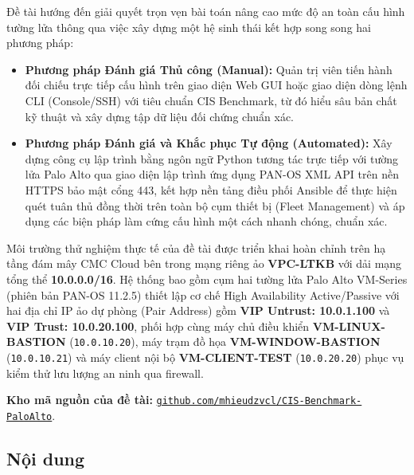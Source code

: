 \documentclass[12pt,a4paper]{article}
\begin{document}
\vspace{0.3cm}

\noindent Đề tài hướng đến giải quyết trọn vẹn bài toán nâng cao mức độ an toàn cấu hình tường lửa thông qua việc xây dựng một hệ sinh thái kết hợp song song hai phương pháp:
\begin{itemize}
    \item \textbf{Phương pháp Đánh giá Thủ công (Manual):} Quản trị viên tiến hành đối chiếu trực tiếp cấu hình trên giao diện Web GUI hoặc giao diện dòng lệnh CLI (Console/SSH) với tiêu chuẩn CIS Benchmark, từ đó hiểu sâu bản chất kỹ thuật và xây dựng tập dữ liệu đối chứng chuẩn xác.
    \item \textbf{Phương pháp Đánh giá và Khắc phục Tự động (Automated):} Xây dựng công cụ lập trình bằng ngôn ngữ Python tương tác trực tiếp với tường lửa Palo Alto qua giao diện lập trình ứng dụng PAN-OS XML API trên nền HTTPS bảo mật cổng 443, kết hợp nền tảng điều phối Ansible để thực hiện quét tuân thủ đồng thời trên toàn bộ cụm thiết bị (Fleet Management) và áp dụng các biện pháp làm cứng cấu hình một cách nhanh chóng, chuẩn xác.
\end{itemize}

\vspace{0.3cm}

\noindent Môi trường thử nghiệm thực tế của đề tài được triển khai hoàn chỉnh trên hạ tầng đám mây CMC Cloud bên trong mạng riêng ảo \textbf{VPC-LTKB} với dải mạng tổng thể \textbf{10.0.0.0/16}. Hệ thống bao gồm cụm hai tường lửa Palo Alto VM-Series (phiên bản PAN-OS 11.2.5) thiết lập cơ chế High Availability Active/Passive với hai địa chỉ IP ảo dự phòng (Pair Address) gồm \textbf{VIP Untrust: 10.0.1.100} và \textbf{VIP Trust: 10.0.20.100}, phối hợp cùng máy chủ điều khiển \textbf{VM-LINUX-BASTION} (\texttt{10.0.10.20}), máy trạm đồ họa \textbf{VM-WINDOW-BASTION} (\texttt{10.0.10.21}) và máy client nội bộ \textbf{VM-CLIENT-TEST} (\texttt{10.0.20.20}) phục vụ kiểm thử lưu lượng an ninh qua firewall.

\vspace{0.3cm}

\noindent\textbf{Kho mã nguồn của đề tài:} \href{https://github.com/mhieudzvcl/CIS-Benchmark-PaloAlto}{\texttt{github.com/mhieudzvcl/CIS-Benchmark-PaloAlto}}.

\subsection{Nội dung}
\end{document}
